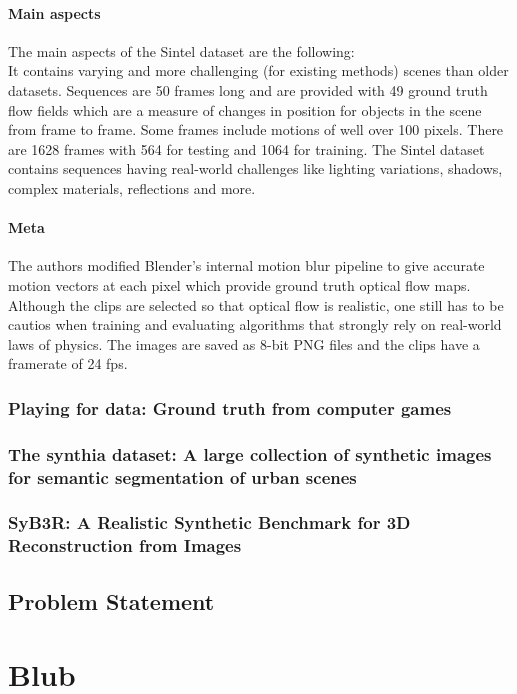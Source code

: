 \documentclass[a4paper,cleardoubleempty,BCOR1cm]{scrbook}
\begin{document}
\subsubsection{Main aspects}
The main aspects of the Sintel dataset are the following:\\
It contains varying and more challenging (for existing methods) scenes than older datasets. Sequences are 50 frames long and are provided with 49 ground truth flow fields which are a measure of changes in position for objects in the scene from frame to frame. Some frames include motions of well over 100 pixels. There are 1628 frames with 564 for testing and 1064 for training. The Sintel dataset contains sequences having real-world challenges like lighting variations, shadows, complex materials, reflections and more.

\subsubsection{Meta}
The authors modified Blender's internal motion blur pipeline to give accurate motion vectors at each pixel which provide ground truth optical flow maps. Although the clips are selected so that optical flow is realistic, one still has to be cautios when training and evaluating algorithms that strongly rely on real-world laws of physics. The images are saved as 8-bit PNG files and the clips have a framerate of 24 fps.

\subsection{Playing for data: Ground truth from computer games}
\cite{Richter_2016_ECCV}

\subsection{The synthia dataset: A large collection of synthetic images for semantic segmentation of urban scenes}
\cite{RosCVPR16}

\subsection{SyB3R: A Realistic Synthetic Benchmark for 3D Reconstruction from Images}
\cite{syb3r2016}








\section{Problem Statement}



\appendix
\chapter{Blub}



\end{document}
